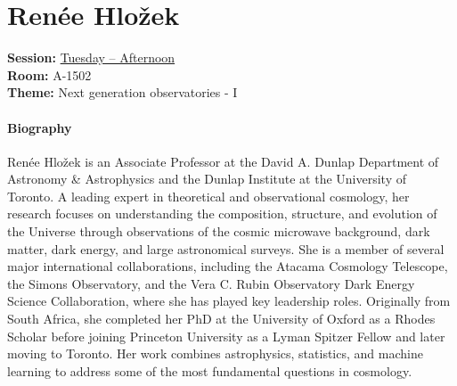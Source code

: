 \hypertarget{invited-renee-hlozek}{}
\label{invited-page-renee-hlozek}
\section{Renée Hložek}
\textbf{Session:} \hyperlink{schedule-tuesday-afternoon-a-1502}{Tuesday -- Afternoon}\\
\textbf{Room:} A-1502\\
\textbf{Theme:} Next generation observatories - I\\

\paragraph{Biography}
{\sffamily
Renée Hložek is an Associate Professor at the David A. Dunlap Department of Astronomy \& Astrophysics and the Dunlap Institute at the University of Toronto. A leading expert in theoretical and observational cosmology, her research focuses on understanding the composition, structure, and evolution of the Universe through observations of the cosmic microwave background, dark matter, dark energy, and large astronomical surveys. She is a member of several major international collaborations, including the Atacama Cosmology Telescope, the Simons Observatory, and the Vera C. Rubin Observatory Dark Energy Science Collaboration, where she has played key leadership roles. Originally from South Africa, she completed her PhD at the University of Oxford as a Rhodes Scholar before joining Princeton University as a Lyman Spitzer Fellow and later moving to Toronto. Her work combines astrophysics, statistics, and machine learning to address some of the most fundamental questions in cosmology.
}


